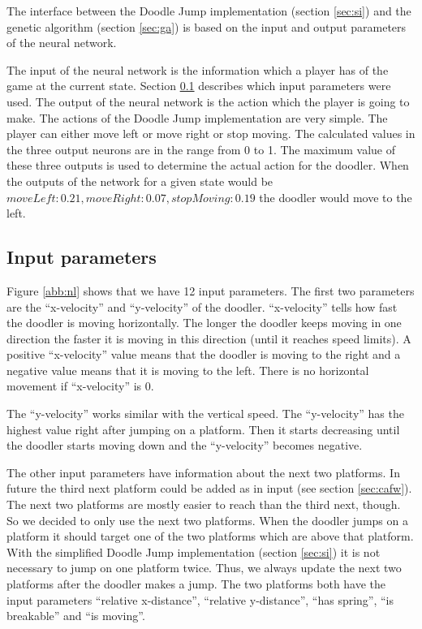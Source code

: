\documentclass[a4paper,12pt,pagesize,headsepline,bibtotoc,titlepage,abstracton]{scrartcl}
\begin{document}
The interface between the Doodle Jump implementation (section \ref{sec:si}) and the genetic algorithm (section \ref{sec:ga}) is based on the input and output parameters of the neural network.

The input of the neural network is the information which a player has of the game at the current state. Section \ref{sec:ip} describes which input parameters were used. The output of the neural network is the action which the player is going to make. The actions of the Doodle Jump implementation are very simple. The player can either move left or move right or stop moving. The calculated values in the three output neurons are in the range from 0 to 1. The maximum value of these three outputs is used to determine the actual action for the doodler. When the outputs of the network for a given state would be $moveLeft: 0.21, moveRight: 0.07, stopMoving: 0.19$ the doodler would move to the left.

\subsection{Input parameters}
\label{sec:ip}

Figure \ref{abb:nl} shows that we have 12 input parameters. The first two parameters are the ``x-velocity'' and ``y-velocity'' of the doodler. ``x-velocity'' tells how fast the doodler is moving horizontally. The longer the doodler keeps moving in one direction the faster it is moving in this direction (until it reaches speed limits). A positive ``x-velocity'' value means that the doodler is moving to the right and a negative value means that it is moving to the left. There is no horizontal movement if ``x-velocity'' is 0.

The ``y-velocity'' works similar with the vertical speed. The ``y-velocity'' has the highest value right after jumping on a platform. Then it starts decreasing until the doodler starts moving down and the ``y-velocity'' becomes negative.

The other input parameters have information about the next two platforms. In future the third next platform could be added as in input (see section \ref{sec:cafw}). The next two platforms are mostly easier to reach than the third next, though. So we decided to only use the next two platforms. When the doodler jumps on a platform it should target one of the two platforms which are above that platform. With the simplified Doodle Jump implementation (section \ref{sec:si}) it is not necessary to jump on one platform twice. Thus, we always update the next two platforms after the doodler makes a jump. The two platforms both have the input parameters ``relative x-distance'', ``relative y-distance'', ``has spring'', ``is breakable'' and ``is moving''.
\end{document}
